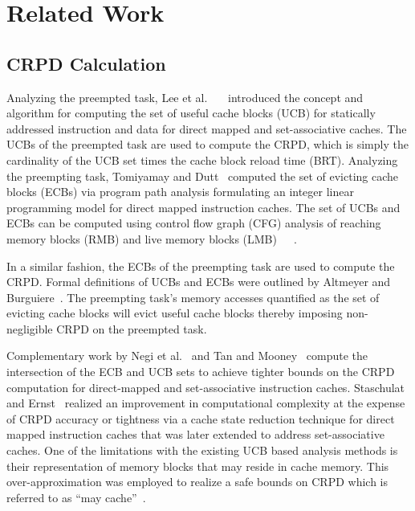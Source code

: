 \section{Related Work}\label{sec:related}

\subsection {CRPD Calculation}\label{sec:crpd_related_work}
Analyzing the preempted task, Lee et al.~\cite{lee:96}~\cite{lee:97}~\cite{lee:98} introduced the concept and algorithm for computing the set of useful cache blocks (UCB) for statically addressed instruction and data for direct mapped and set-associative caches.
The UCBs of the preempted task are used to compute the CRPD, which is simply the cardinality of the UCB set times the cache block reload time (BRT).
\newline
\indent
Analyzing the preempting task, Tomiyamay and Dutt~\cite{tomiyamay:00} computed the set of evicting cache blocks (ECBs) via program path analysis formulating an integer linear programming model for direct mapped instruction caches.  The set of UCBs and ECBs can be computed using control flow graph (CFG) analysis of reaching memory blocks (RMB) and live memory blocks (LMB)~\cite{lee:96}~\cite{lee:97}~\cite{lee:98}.

In a similar fashion, the ECBs of the preempting task are used to compute the CRPD.
Formal definitions of UCBs and ECBs were outlined by Altmeyer and Burguiere~\cite{altmeyer:11c}.  The preempting task’s memory accesses quantified as the set of evicting cache blocks will evict useful cache blocks thereby imposing non-negligible CRPD on the preempted task.

Complementary work by Negi et al.~\cite{negi:03} and Tan and Mooney~\cite{tan:04} compute the intersection of the ECB and UCB sets to achieve tighter bounds on the CRPD computation for direct-mapped and set-associative instruction caches. 
Staschulat and Ernst~\cite{staschulat:05c} realized an improvement in computational complexity at the expense of CRPD accuracy or tightness via a cache state reduction technique for direct mapped instruction caches that was later extended to address set-associative caches. 
One of the limitations with the existing UCB based analysis methods is their representation of memory blocks that may reside in cache memory.  This over-approximation was employed to realize a safe bounds on CRPD which is referred to as “may cache”~\cite{altmeyer:11c}.

